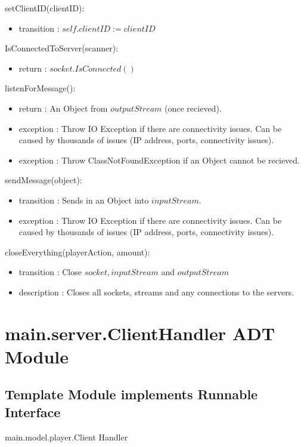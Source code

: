 \documentclass[12pt, titlepage]{article}
\begin{document}
        \noindent setClientID(clientID):
        \begin{itemize}
        \item transition : $self.clientID := clientID$
        \end{itemize}
        
        \noindent IsConnectedToServer(scanner):
        \begin{itemize}
        \item return : $socket.IsConnected()$
        \end{itemize}
        
        \noindent listenForMessage():
        \begin{itemize}
        \item return : An Object from $outputStream$ (once recieved).
        \item exception : Throw IO Exception if there are connectivity issues. Can be caused by thousands of issues (IP address, ports, connectivity issues).
        \item exception : Throw ClassNotFoundException if an Object cannot be recieved.
        \end{itemize}
        
        \noindent sendMessage(object):
        \begin{itemize}
        \item transition : Sends in an Object into $inputStream$.
        \item exception : Throw IO Exception if there are connectivity issues. Can be caused by thousands of issues (IP address, ports, connectivity issues).
        \end{itemize}
        
        \noindent closeEverything(playerAction, amount):
        \begin{itemize}
        \item transition : Close $socket, inputStream$ and $outputStream$
        \item description : Closes all sockets,  streams and any connections to the servers.
        \end{itemize}
                
                
        
\section* {main.server.ClientHandler ADT Module}
    \subsection* {Template Module implements Runnable Interface}
    main.model.player.Client Handler
\end{document}
